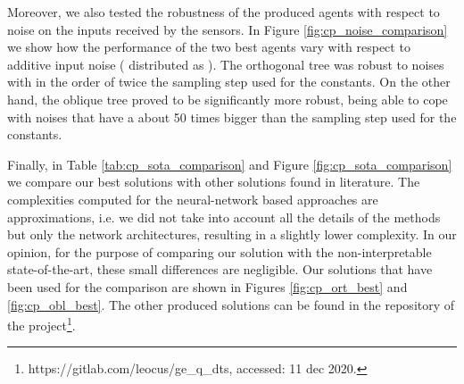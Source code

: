 \documentclass[review,english]{elsarticle}
\begin{document}
Moreover, we also tested the robustness of the produced agents with respect to noise on the inputs received by the sensors.
In Figure \ref{fig:cp_noise_comparison} we show how the performance of the two best agents vary with respect to additive input noise ( distributed as ).
The orthogonal tree was robust to noises with  in the order of twice the sampling step used for the constants.
On the other hand, the oblique tree proved to be significantly more robust, being able to cope with noises that have a  about 50 times bigger than the sampling step used for the constants.



Finally, in Table \ref{tab:cp_sota_comparison} and Figure \ref{fig:cp_sota_comparison} we compare our best solutions with other solutions found in literature.
The complexities computed for the neural-network based approaches are approximations, i.e. we did not take into account all the details of the methods but only the network architectures, resulting in a slightly lower complexity. In our opinion, for the purpose of comparing our solution with the non-interpretable state-of-the-art, these small differences are negligible.
Our solutions that have been used for the comparison are shown in Figures \ref{fig:cp_ort_best} and \ref{fig:cp_obl_best}.
The other produced solutions can be found in the repository of the project\footnote{https://gitlab.com/leocus/ge\_q\_dts, accessed: 11 dec 2020.}.
\end{document}
